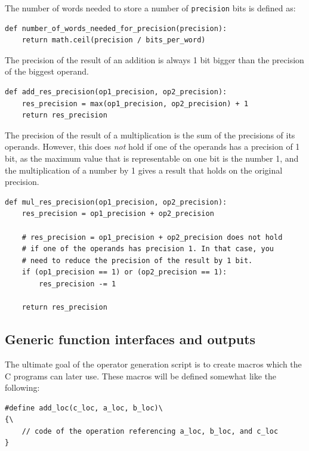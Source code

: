 \documentclass[12pt, a4paper]{report}
\begin{document}
The number of words needed to store a number of \verb+precision+ bits is defined
as:

\begin{lstlisting}
def number_of_words_needed_for_precision(precision):
    return math.ceil(precision / bits_per_word)
\end{lstlisting}

The precision of the result of an addition is always 1 bit bigger than the
precision of the biggest operand.

\begin{lstlisting}
def add_res_precision(op1_precision, op2_precision):
    res_precision = max(op1_precision, op2_precision) + 1
    return res_precision
\end{lstlisting}

The precision of the result of a multiplication is the sum of the precisions of
its operands.
However, this does \emph{not} hold if one of the operands has a precision of 1
bit, as the maximum value that is representable on one bit is the number 1, and
the multiplication of a number by 1 gives a result that holds on the original
precision.

\begin{lstlisting}
def mul_res_precision(op1_precision, op2_precision):
    res_precision = op1_precision + op2_precision

    # res_precision = op1_precision + op2_precision does not hold
    # if one of the operands has precision 1. In that case, you
    # need to reduce the precision of the result by 1 bit.
    if (op1_precision == 1) or (op2_precision == 1):
        res_precision -= 1

    return res_precision
\end{lstlisting}

\subsection{Generic function interfaces and outputs}
The ultimate goal of the operator generation script is to create macros which
the C programs can later use. These macros will be defined somewhat like the
following:

\begin{lstlisting}
#define add_loc(c_loc, a_loc, b_loc)\
{\
    // code of the operation referencing a_loc, b_loc, and c_loc
}
\end{lstlisting}
\end{document}
